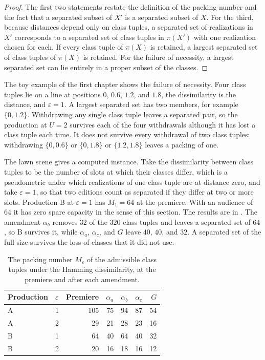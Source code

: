 \documentclass[11pt,twoside,openright]{book}
\theoremstyle{plain}
\theoremstyle{definition}
\theoremstyle{remark}
\begin{document}
\begin{proof}
The first two statements restate the definition of the packing number and the fact that a separated subset of $X'$ is a separated subset of $X$. For the third, because distances depend only on class tuples, a separated set of realizations in $X'$ corresponds to a separated set of class tuples in $\pi(X')$ with one realization chosen for each. If every class tuple of $\pi(X)$ is retained, a largest separated set of class tuples of $\pi(X)$ is retained. For the failure of necessity, a largest separated set can lie entirely in a proper subset of the classes.
\end{proof}

The toy example of the first chapter shows the failure of necessity. Four class tuples lie on a line at positions $0$, $0.6$, $1.2$, and $1.8$, the dissimilarity is the distance, and $\varepsilon=1$. A largest separated set has two members, for example $\{0,1.2\}$. Withdrawing any single class tuple leaves a separated pair, so the production at $U=2$ survives each of the four withdrawals although it has lost a class tuple each time. It does not survive every withdrawal of two class tuples: withdrawing $\{0,0.6\}$ or $\{0,1.8\}$ or $\{1.2,1.8\}$ leaves a packing of one.

The lawn scene gives a computed instance. Take the dissimilarity between class tuples to be the number of slots at which their classes differ, which is a pseudometric under which realizations of one class tuple are at distance zero, and take $\varepsilon=1$, so that two editions count as separated if they differ at two or more slots. Production B at $\varepsilon=1$ has $M_1=64$ at the premiere. With an audience of $64$ it has zero spare capacity in the sense of this section. The results are in . The amendment $\alpha_b$ removes $32$ of the $320$ class tuples and leaves a separated set of $64$, so B survives it, while $\alpha_a$, $\alpha_c$, and $G$ leave $40$, $40$, and $32$. A separated set of the full size survives the loss of classes that it did not use.

\begin{table}[ht]
\centering
\begin{tabular}{@{}llrrrrr@{}}
\toprule
Production & $\varepsilon$ & Premiere & $\alpha_a$ & $\alpha_b$ & $\alpha_c$ & $G$\\
\midrule
A & 1 & 105 & 75 & 94 & 87 & 54\\
A & 2 & 29 & 21 & 28 & 23 & 16\\
B & 1 & 64 & 40 & 64 & 40 & 32\\
B & 2 & 20 & 16 & 18 & 16 & 12\\
\bottomrule
\end{tabular}
\caption{The packing number $M_\varepsilon$ of the admissible class tuples under the Hamming dissimilarity, at the premiere and after each amendment.}\label{tab:threshold}
\end{table}
\end{document}
